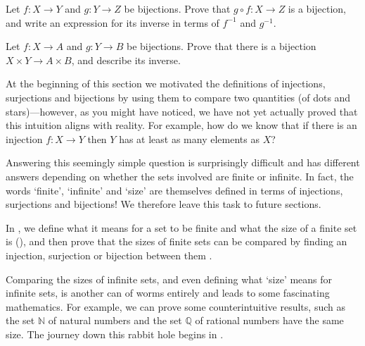 \begin{exercise}
\label{exCompositeBijection}
Let $f : X \to Y$ and $g : Y \to Z$ be bijections. Prove that $g \circ f : X \to Z$ is a bijection, and write an expression for its inverse in terms of $f^{-1}$ and $g^{-1}$.
\end{exercise}

\begin{exercise}
Let $f : X \to A$ and $g : Y \to B$ be bijections. Prove that there is a bijection $X \times Y \to A \times B$, and describe its inverse.
\end{exercise}

At the beginning of this section we motivated the definitions of injections, surjections and bijections by using them to compare two quantities (of dots and stars)---however, as you might have noticed, we have not yet actually proved that this intuition aligns with reality. For example, how do we know that if there is an injection $f : X \to Y$ then $Y$ has at least as many elements as $X$?

Answering this seemingly simple question is surprisingly difficult and has different answers depending on whether the sets involved are finite or infinite. In fact, the words `finite', `infinite' and `size' are themselves defined in terms of injections, surjections and bijections! We therefore leave this task to future sections.

In , we define what it means for a set to be finite and what the size of a finite set is (), and then prove that the sizes of finite sets can be compared by finding an injection, surjection or bijection between them .

Comparing the sizes of infinite sets, and even defining what `size' means for infinite sets, is another can of worms entirely and leads to some fascinating mathematics. For example, we can prove some counterintuitive results, such as the set $\mathbb{N}$ of natural numbers and the set $\mathbb{Q}$ of rational numbers have the same size. The journey down this rabbit hole begins in .

